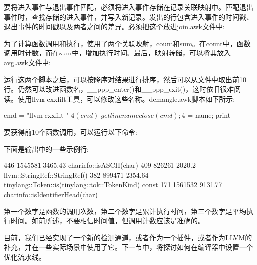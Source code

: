 要将进入事件与退出事件匹配，必须将进入事件存储在记录关联映射中。匹配退出事件时，查找存储的进入事件，并写入新记录。发出的行包含进入事件的时间戳、退出事件的时间戳以及两者之间的差异。必须把这个放进join.awk文件中:


为了计算函数调用和执行，使用了两个关联映射，count和sum。在count中，函数调用时计数，而在sum中，增加执行时间。最后，映射转储，可以将其放入avg.awk文件中:


运行这两个脚本之后，可以按降序对结果进行排序，然后可以从文件中取出前10行。仍然可以改进函数名，\_\_ppp\_enter()和\_\_ppp\_exit()，这时依旧很难阅读。使用llvm-cxxfilt工具，可以修改这些名称。demangle.awk脚本如下所示:

\begin{shell}
{ cmd = "llvm-cxxfilt " $4
    (cmd) | getline name
    close(cmd); $4 = name; print }
\end{shell}

要获得前10个函数调用，可以运行以下命令:


下面是输出中的一些示例行:

\begin{shell}
446 1545581 3465.43 charinfo::isASCII(char)
409 826261 2020.2 llvm::StringRef::StringRef()
382 899471 2354.64
            tinylang::Token::is(tinylang::tok::TokenKind) const
171 1561532 9131.77 charinfo::isIdentifierHead(char)
\end{shell}

第一个数字是函数的调用次数，第二个数字是累计执行时间，第三个数字是平均执行时间。如前所述，不要相信时间值，但调用计数应该是准确的。

目前，我们已经实现了一个新的检测通道，或者作为一个插件，或者作为LLVM的补充，并在一些实际场景中使用了它。下一节中，将探讨如何在编译器中设置一个优化流水线。


